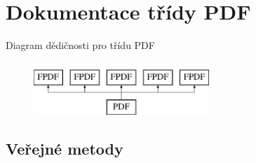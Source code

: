\hypertarget{class_p_d_f}{\section{Dokumentace třídy P\-D\-F}
\label{class_p_d_f}
}
Diagram dědičnosti pro třídu P\-D\-F\begin{figure}[H]
\begin{center}
\leavevmode
\includegraphics[height=2.000000cm]{class_p_d_f}
\end{center}
\end{figure}
\subsection*{Veřejné metody}
